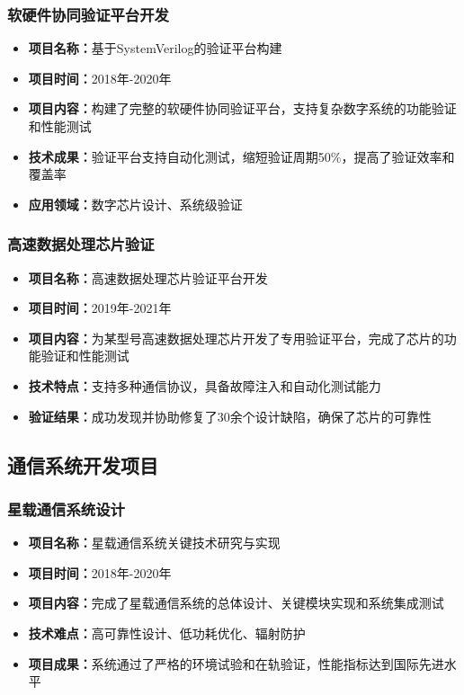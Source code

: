 \documentclass[fontset=windows]{article}
\begin{document}
\subsubsection{软硬件协同验证平台开发}
\begin{itemize}
    \item \textbf{项目名称：}基于SystemVerilog的验证平台构建
    \item \textbf{项目时间：}2018年-2020年
    \item \textbf{项目内容：}构建了完整的软硬件协同验证平台，支持复杂数字系统的功能验证和性能测试
    \item \textbf{技术成果：}验证平台支持自动化测试，缩短验证周期50\%，提高了验证效率和覆盖率
    \item \textbf{应用领域：}数字芯片设计、系统级验证
\end{itemize}

\subsubsection{高速数据处理芯片验证}
\begin{itemize}
    \item \textbf{项目名称：}高速数据处理芯片验证平台开发
    \item \textbf{项目时间：}2019年-2021年
    \item \textbf{项目内容：}为某型号高速数据处理芯片开发了专用验证平台，完成了芯片的功能验证和性能测试
    \item \textbf{技术特点：}支持多种通信协议，具备故障注入和自动化测试能力
    \item \textbf{验证结果：}成功发现并协助修复了30余个设计缺陷，确保了芯片的可靠性
\end{itemize}

\subsection{通信系统开发项目}

\subsubsection{星载通信系统设计}
\begin{itemize}
    \item \textbf{项目名称：}星载通信系统关键技术研究与实现
    \item \textbf{项目时间：}2018年-2020年
    \item \textbf{项目内容：}完成了星载通信系统的总体设计、关键模块实现和系统集成测试
    \item \textbf{技术难点：}高可靠性设计、低功耗优化、辐射防护
    \item \textbf{项目成果：}系统通过了严格的环境试验和在轨验证，性能指标达到国际先进水平
\end{itemize}
\end{document}
